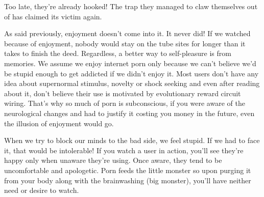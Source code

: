 \documentclass[easypeasy.tex]{subfiles}
\begin{document}
Too late, they're already hooked! The trap they managed to claw themselves out of has claimed its victim again.

As said previously, enjoyment doesn't come into it. It never did! If we watched because of enjoyment, nobody would stay on the tube sites for longer than it takes to finish the deed. Regardless, a better way to self-pleasure is from memories. We assume we enjoy internet porn only because we can't believe we'd be stupid enough to get addicted if we didn't enjoy it. Most users don't have any idea about supernormal stimulus, novelty or shock seeking and even after reading about it, don't believe their use is motivated by evolutionary reward circuit wiring. That's why so much of porn is subconscious, if you were aware of the neurological changes and had to justify it costing you money in the future, even the illusion of enjoyment would go.

When we try to block our minds to the bad side, we feel stupid. If we had to face it, that would be intolerable! If you watch a user in action, you'll see they're happy only when unaware they're using. Once aware, they tend to be uncomfortable and apologetic. Porn feeds the little monster so upon purging it from your body along with the brainwashing (big monster), you'll have neither need or desire to watch.
\end{document}

